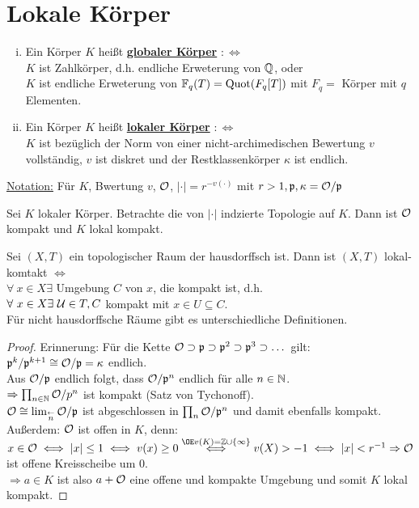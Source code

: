 \section{Lokale Körper}
\begin{defi}
\begin{enumerate}[i)]
\item Ein Körper $K$ heißt \textbf{\underline{globaler Körper}} $:\iff$\\
$K$ ist Zahlkörper, d.h. endliche Erweterung von $\mathbb{Q}$, oder\\
$K$ ist endliche Erweterung von $\mathbb{F}_q(T)=\operatorname{Quot}(F_q[T])$ mit $F_q=$ Körper mit $q$ Elementen.
\item Ein Körper $K$ heißt \textbf{\underline{lokaler Körper}} $: \iff$\\
$K$ ist bezüglich der Norm von einer nicht-archimedischen Bewertung $v$ vollständig, $v$ ist diskret und der Restklassenkörper $\kappa$ ist endlich.
\end{enumerate}
\underline{Notation:} Für $K$, Bwertung $v$, $\mathcal{O}$, $|\cdot|=r^{-v(\cdot)}$ mit $r >1, \mathfrak{p}, \kappa=\mathcal{O}/\mathfrak{p}$
\end{defi}

\begin{Prop}
Sei $K$ lokaler Körper. Betrachte die von $|\cdot|$ indzierte Topologie auf $K$. Dann ist $\mathcal{O}$ kompakt und $K$ lokal kompakt.
\end{Prop}

\begin{Err}
Sei $(X,T)$ ein topologischer Raum der hausdorffsch ist. Dann ist $(X,T)$ lokal-komtakt $\iff$\\
$\forall \ x \in X \exists$ Umgebung $C$ von $x$, die kompakt ist, d.h.\\
$\forall \ x \in X \exists \ \mathcal{U} \in T, C$ kompakt mit $x \in U \subseteq C$.\\
\danger Für nicht hausdorffsche Räume gibt es unterschiedliche Definitionen. %
\end{Err}

\begin{proof}
Erinnerung: Für die Kette $ \mathcal{O} \supset \mathfrak{p} \supset \mathfrak{p}^2 \supset \mathfrak{p}^3 \supset \dots$ gilt:\\
$\mathfrak{p}^k/\mathfrak{p}^{k+1} \cong \mathcal{O}/\mathfrak{p} = \kappa$ endlich.\\
Aus $\mathcal{O}/\mathfrak{p}$ endlich folgt, dass $\mathcal{O}/\mathfrak{p}^n$ endlich für alle $n \in \mathbb{N}$.\\
$\Rightarrow \prod_{n \in \mathbb{N}} \mathcal{O}/p^n$ ist kompakt (Satz von Tychonoff).\\
$\mathcal{O} \cong \lim_{\stackrel{\leftarrow}{n}} \mathcal{O}/\mathfrak{p}$ ist abgeschlossen in $\prod_n \mathcal{O}/\mathfrak{p}^n$ und damit ebenfalls kompakt.\\
Außerdem: $\mathcal{O}$ ist offen in $K$, denn:\\
$x \in \O \iff |x| \leq 1 \iff v(x) \geq 0 \stackrel{\OE v(K)=\Z\cup \{\infty\}}{\iff} v(X) >-1 \iff |x|<r^{-1} \Rightarrow \O$ ist offene Kreisscheibe um 0.\\
$\Rightarrow a \in K$ ist also $a+\mathcal{O}$ eine offene und kompakte Umgebung und somit $K$ lokal kompakt.
\end{proof}